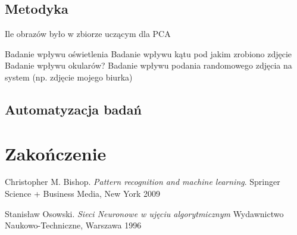 \documentclass{article}
\begin{document}
\subsection{Metodyka}

Ile obrazów było w zbiorze uczącym dla PCA

Badanie wpływu oświetlenia
Badanie wpływu kątu pod jakim zrobiono zdjęcie
Badanie wpływu okularów?
Badanie wpływu podania randomowego zdjęcia na system (np. zdjęcie mojego biurka)


\subsection{Automatyzacja badań}


\section{Zakończenie}

\newpage
\begin{thebibliography}{9}

Christopher M. Bishop.
\textit{Pattern recognition and machine learning}.
Springer Science + Business Media, New York 2009

Stanisław Osowski.
\textit{Sieci Neuronowe w ujęciu algorytmicznym}
Wydawnictwo Naukowo-Techniczne, Warszawa 1996

\end{thebibliography}
\end{document}
